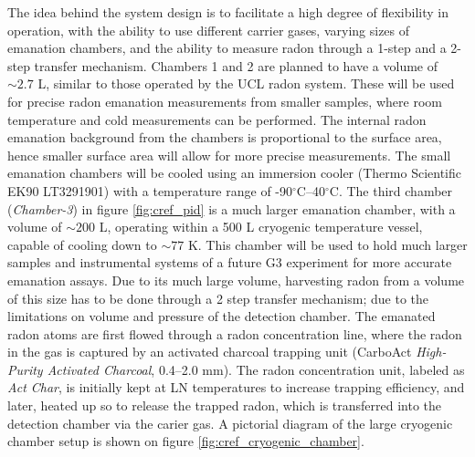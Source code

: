 The idea behind the system design is to facilitate a high degree of flexibility in operation, with the ability to use different carrier gases, varying sizes of emanation chambers, and the ability to measure radon through a 1-step and a 2-step transfer mechanism. Chambers 1 and 2 are planned to have a volume of $\sim2.7$ L, similar to those operated by the UCL radon system. These will be used for precise radon emanation measurements from smaller samples, where room temperature and cold measurements can be performed. The internal radon emanation background from the chambers is proportional to the surface area, hence smaller surface area will allow for more precise measurements. The small emanation chambers will be cooled using an immersion cooler (Thermo Scientific EK90 LT3291901) with a temperature range of -90$^{\circ}$C--40$^{\circ}$C. The third chamber (\textit{Chamber-3}) in figure \ref{fig:cref_pid} is a much larger emanation chamber, with a volume of $\sim200$ L, operating within a 500 L cryogenic temperature vessel, capable of cooling down to $\sim77$ K. This chamber will be used to hold much larger samples and instrumental systems of a future G3 experiment for more accurate emanation assays. Due to its much large volume, harvesting radon from a volume of this size has to be done through a 2 step transfer mechanism; due to the limitations on volume and pressure of the detection chamber. The emanated radon atoms are first flowed through a radon concentration line, where the radon in the gas is captured by an activated charcoal trapping unit (CarboAct \textit{High-Purity Activated Charcoal}, 0.4--2.0 mm). The radon concentration unit, labeled as \textit{Act Char}, is initially kept at LN temperatures to increase trapping efficiency, and later, heated up so to release the trapped radon, which is transferred into the detection chamber via the carier gas. A pictorial diagram of the large cryogenic chamber setup is shown on figure \ref{fig:cref_cryogenic_chamber}.
%
